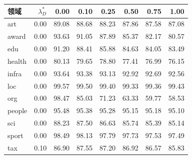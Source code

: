 \begin{tabular}{lrrrrrrr}
\toprule
领域 & $\lambda_D^*$ & 0.00 & 0.10 & 0.25 & 0.50 & 0.75 & 1.00 \\
\midrule
art & 0.00 & 89.08 & 88.68 & 88.23 & 87.86 & 87.58 & 87.08 \\
award & 0.00 & 93.63 & 91.05 & 87.89 & 85.37 & 82.17 & 80.57 \\
edu & 0.00 & 91.20 & 88.41 & 85.88 & 84.63 & 84.05 & 83.49 \\
health & 0.00 & 80.13 & 79.65 & 78.80 & 77.41 & 76.99 & 76.15 \\
infra & 0.00 & 93.64 & 93.38 & 93.13 & 92.92 & 92.69 & 92.56 \\
loc & 0.00 & 99.57 & 99.50 & 99.40 & 99.33 & 99.36 & 99.43 \\
org & 0.00 & 98.47 & 85.03 & 71.23 & 63.33 & 59.77 & 58.53 \\
people & 0.00 & 95.48 & 95.38 & 95.28 & 95.15 & 95.18 & 95.10 \\
sci & 0.00 & 88.23 & 87.50 & 86.63 & 85.74 & 85.39 & 85.14 \\
sport & 0.00 & 98.49 & 98.13 & 97.79 & 97.73 & 97.53 & 97.49 \\
tax & 0.10 & 86.90 & 87.55 & 87.20 & 86.92 & 86.57 & 85.83 \\
\bottomrule
\end{tabular}
